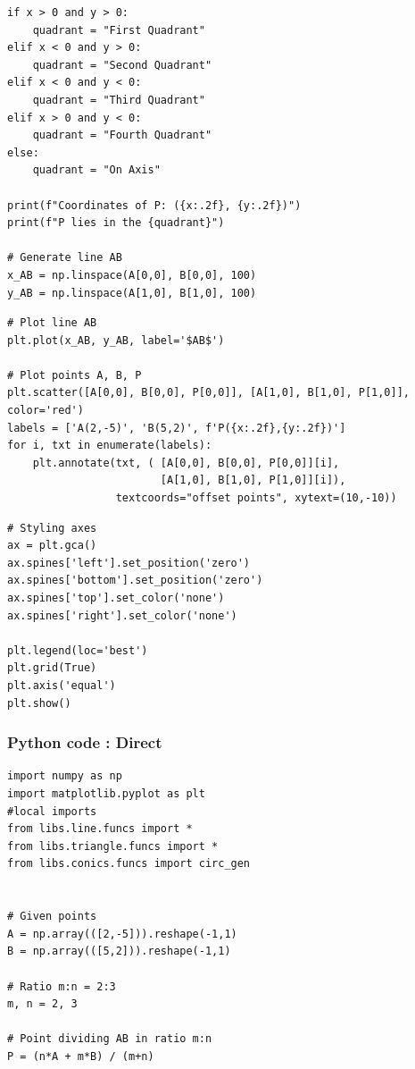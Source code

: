 \documentclass{beamer}
\begin{document}
\begin{frame}[fragile]
	\begin{lstlisting}
if x > 0 and y > 0:
    quadrant = "First Quadrant"
elif x < 0 and y > 0:
    quadrant = "Second Quadrant"
elif x < 0 and y < 0:
    quadrant = "Third Quadrant"
elif x > 0 and y < 0:
    quadrant = "Fourth Quadrant"
else:
    quadrant = "On Axis"

print(f"Coordinates of P: ({x:.2f}, {y:.2f})")
print(f"P lies in the {quadrant}")

# Generate line AB
x_AB = np.linspace(A[0,0], B[0,0], 100)
y_AB = np.linspace(A[1,0], B[1,0], 100)

	\end{lstlisting}
\end{frame}

\begin{frame}[fragile]
	
	\begin{lstlisting}
# Plot line AB
plt.plot(x_AB, y_AB, label='$AB$')

# Plot points A, B, P
plt.scatter([A[0,0], B[0,0], P[0,0]], [A[1,0], B[1,0], P[1,0]], color='red')
labels = ['A(2,-5)', 'B(5,2)', f'P({x:.2f},{y:.2f})']
for i, txt in enumerate(labels):
    plt.annotate(txt, ( [A[0,0], B[0,0], P[0,0]][i],
                        [A[1,0], B[1,0], P[1,0]][i]),
                 textcoords="offset points", xytext=(10,-10))
	\end{lstlisting}
\end{frame}
\begin{frame}[fragile]
	
	\begin{lstlisting}
# Styling axes
ax = plt.gca()
ax.spines['left'].set_position('zero')
ax.spines['bottom'].set_position('zero')
ax.spines['top'].set_color('none')
ax.spines['right'].set_color('none')

plt.legend(loc='best')
plt.grid(True)
plt.axis('equal')
plt.show()

	\end{lstlisting}
\end{frame}

	\begin{frame}[fragile]
\frametitle{Python code : Direct }

\begin{lstlisting}
import numpy as np
import matplotlib.pyplot as plt
#local imports
from libs.line.funcs import *
from libs.triangle.funcs import *
from libs.conics.funcs import circ_gen


# Given points
A = np.array(([2,-5])).reshape(-1,1)
B = np.array(([5,2])).reshape(-1,1)

# Ratio m:n = 2:3
m, n = 2, 3

# Point dividing AB in ratio m:n
P = (n*A + m*B) / (m+n)
\end{lstlisting}
\end{frame}
\end{document}
